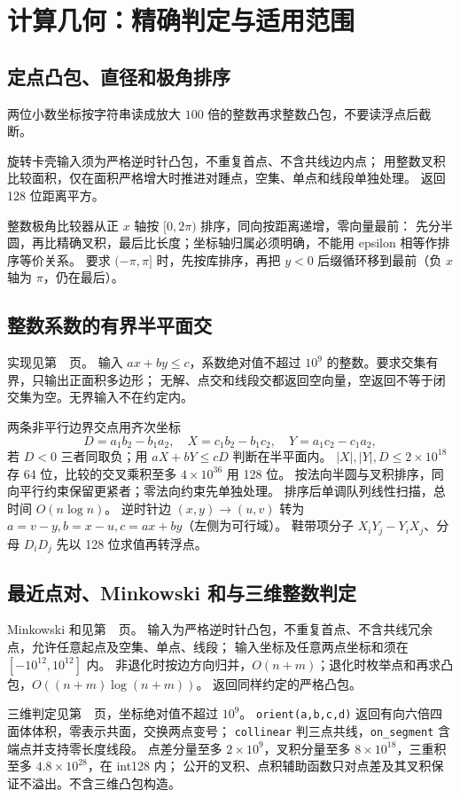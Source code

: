 \chapter{计算几何：精确判定与适用范围}
\section{定点凸包、直径和极角排序}
两位小数坐标按字符串读成放大 $100$ 倍的整数再求整数凸包，不要读浮点后截断。

旋转卡壳输入须为严格逆时针凸包，不重复首点、不含共线边内点；
用整数叉积比较面积，仅在面积严格增大时推进对踵点，空集、单点和线段单独处理。
返回 128 位距离平方。

整数极角比较器从正 $x$ 轴按 $[0,2\pi)$ 排序，同向按距离递增，零向量最前：
先分半圆，再比精确叉积，最后比长度；坐标轴归属必须明确，不能用 epsilon 相等作排序等价关系。
要求 $(-\pi,\pi]$ 时，先按库排序，再把 $y<0$ 后缀循环移到最前（负 $x$ 轴为 $\pi$，仍在最后）。

\section{整数系数的有界半平面交}
实现见第~\pageref{compact-IntegerHalfplanes}~页。
输入 $ax+by\le c$，系数绝对值不超过 $10^9$ 的整数。要求交集有界，只输出正面积多边形；
无解、点交和线段交都返回空向量，空返回不等于闭交集为空。无界输入不在约定内。

两条非平行边界交点用齐次坐标
\[
D=a_1b_2-b_1a_2,\quad X=c_1b_2-b_1c_2,\quad Y=a_1c_2-c_1a_2,
\]
若 $D<0$ 三者同取负；用 $aX+bY\le cD$ 判断在半平面内。
$|X|,|Y|,D\le2\times10^{18}$ 存 64 位，比较的交叉乘积至多 $4\times10^{36}$ 用 128 位。
按法向半圆与叉积排序，同向平行约束保留更紧者；零法向约束先单独处理。
排序后单调队列线性扫描，总时间 $O(n\log n)$。
逆时针边 $(x,y)\to(u,v)$ 转为 $a=v-y,b=x-u,c=ax+by$（左侧为可行域）。
鞋带项分子 $X_iY_j-Y_iX_j$、分母 $D_iD_j$ 先以 128 位求值再转浮点。

\section{最近点对、Minkowski 和与三维整数判定}
Minkowski 和见第~\pageref{compact-minkowski_sum}~页。
输入为严格逆时针凸包，不重复首点、不含共线冗余点，允许任意起点及空集、单点、线段；
输入坐标及任意两点坐标和须在 $[-10^{12},10^{12}]$ 内。
非退化时按边方向归并，$O(n+m)$；退化时枚举点和再求凸包，$O((n+m)\log(n+m))$。
返回同样约定的严格凸包。

三维判定见第~\pageref{compact-IntegerGeometry3D}~页，坐标绝对值不超过 $10^9$。
\texttt{orient(a,b,c,d)} 返回有向六倍四面体体积，零表示共面，交换两点变号；
\texttt{collinear} 判三点共线，\texttt{on\_segment} 含端点并支持零长度线段。
点差分量至多 $2\times10^9$，叉积分量至多 $8\times10^{18}$，三重积至多 $4.8\times10^{28}$，在 int128 内；
公开的叉积、点积辅助函数只对点差及其叉积保证不溢出。不含三维凸包构造。

